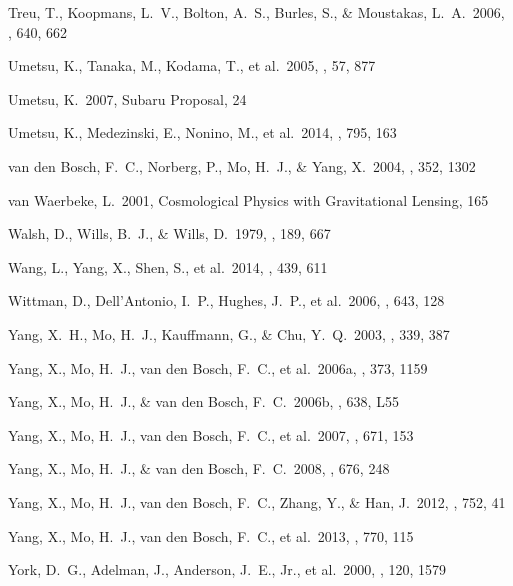 \documentclass[apj]{emulateapj}
\begin{document}
\begin{thebibliography}{}
 Treu, T., Koopmans, L.~V.,
  Bolton, A.~S., Burles, S., \& Moustakas, L.~A.\ 2006, \apj, 640, 662


  Umetsu, K., Tanaka, M.,
  Kodama, T., et al.\ 2005, \pasj, 57, 877

  Umetsu, K.\ 2007, Subaru
  Proposal, 24

  Umetsu, K., Medezinski,
  E., Nonino, M., et al.\ 2014, \apj, 795, 163

  van den Bosch,
  F.~C., Norberg, P., Mo, H.~J., \& Yang, X.\ 2004, \mnras, 352, 1302

  van Waerbeke, L.\ 2001,
Cosmological Physics with Gravitational Lensing, 165

  Walsh, D., Wills, B.~J.,
  \& Wills, D.\ 1979, \mnras, 189, 667


  Wang, L., Yang, X., Shen,
  S., et al.\ 2014, \mnras, 439, 611
  
   Wittman, D., 
Dell'Antonio, I.~P., Hughes, J.~P., et al.\ 2006, \apj, 643, 128 



  Yang, X.~H., Mo, H.~J.,
Kauffmann, G., \& Chu, Y.~Q.\ 2003, \mnras, 339, 387


 Yang, X., Mo, H.~J., van
den Bosch, F.~C., et al.\ 2006a, \mnras, 373, 1159


 Yang, X., Mo, H.~J.,
\& van den Bosch, F.~C.\ 2006b, \apjl, 638, L55


  Yang, X., Mo, H.~J., van
 den Bosch, F.~C., et al.\ 2007, \apj, 671, 153

  Yang, X., Mo, H.~J.,
   \& van den Bosch, F.~C.\ 2008, \apj, 676, 248

 Yang, X., Mo, H.~J., van den
  Bosch, F.~C., Zhang, Y., \& Han, J.\ 2012, \apj, 752, 41

  Yang, X., Mo, H.~J., van den
   Bosch, F.~C., et al.\ 2013, \apj, 770, 115


  York, D.~G., Adelman, J.,
 Anderson, J.~E., Jr., et al.\ 2000, \aj, 120, 1579


\end{thebibliography}
\end{document}
